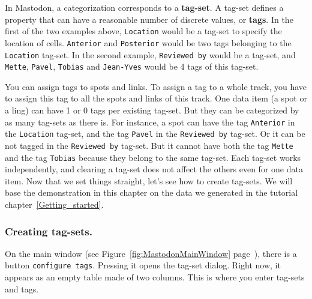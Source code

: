 In Mastodon, a categorization corresponds to a \textbf{tag-set}.
A tag-set defines a property that can have a reasonable number of discrete values, or \textbf{tags}.
In the first of the two examples above, \texttt{Location} would be a tag-set to specify the location of cells.
\texttt{Anterior} and \texttt{Posterior} would be two tags belonging to the \texttt{Location} tag-set.
In the second example, \texttt{Reviewed by} would be a tag-set, and \texttt{Mette}, \texttt{Pavel}, \texttt{Tobias} and \texttt{Jean-Yves} would be 4 tags of this tag-set.

You can assign tags to spots and links.
To assign a tag to a whole track, you have to assign this tag to all the spots and links of this track.
One data item (a spot or a ling) can have 1 or 0 tags per existing tag-set.
But they can be categorized by as many tag-sets as there is.
For instance, a spot can have the tag \texttt{Anterior} in the \texttt{Location} tag-set, and the tag \texttt{Pavel} in the \texttt{Reviewed by} tag-set. 
Or it can be not tagged in the \texttt{Reviewed by} tag-set.
But it cannot have both the tag \texttt{Mette} and the tag \texttt{Tobias} because they belong to the same tag-set.
Each tag-set works independently, and clearing a tag-set does not affect the others even for one data item.
Now that we set things straight, let's see how to create tag-sets.
We will base the demonstration in this chapter on the data we generated in the tutorial chapter~\ref{Getting_started}.


\subsubsection{Creating tag-sets.}

On the main window (see Figure~\ref{fig:MastodonMainWindow} page~\pageref{fig:MastodonMainWindow}), there is a button \texttt{configure tags}. 
Pressing it opens the tag-set dialog. 
Right now, it appears as an empty table made of two columns. 
This is where you enter tag-sets and tags.

